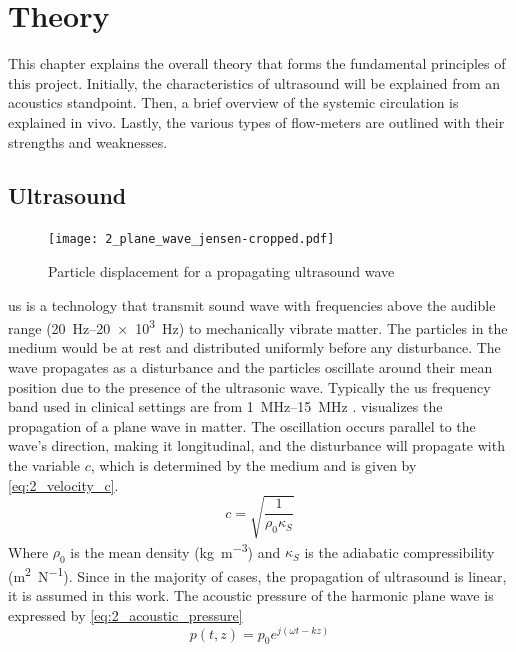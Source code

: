 \chapter{Theory} \label{sec:theory}
This chapter explains the overall theory that forms the fundamental principles of this project. Initially, the characteristics of ultrasound will be explained from an acoustics standpoint. Then, a brief overview of the systemic circulation is explained in vivo. Lastly, the various types of flow-meters are outlined with their strengths and weaknesses. 
\section{Ultrasound}
\begin{figure}[ht]
	\centering
	\texttt{[image: 2\_plane\_wave\_jensen-cropped.pdf]}
	\caption[Particle displacement for a propagating ultrasound wave]{Particle displacement for a propagating ultrasound wave \cite{JensenUltrasoundBook}}
	\label{fig:2_planewave_jensen}
\end{figure}
\gls{us} is a technology that transmit sound wave with frequencies above the audible range (\qtyrange[range-units = single]{20}{20e3}{\hertz}) to mechanically vibrate matter. The particles in the medium would be at rest and distributed uniformly before any disturbance. The wave propagates as a disturbance and the particles oscillate around their mean position due to the presence of the ultrasonic wave. Typically the \gls{us} frequency band used in clinical settings are from \qtyrange[range-units = single]{1}{15}{\mega\hertz} \cite{Szabo_UltrasoundBook_2}.  visualizes the propagation of a plane wave in matter. The oscillation occurs parallel to the wave's direction, making it longitudinal, and the disturbance will propagate with the variable $c$, which is determined by the medium and is given by \cref{eq:2_velocity_c}.
\begin{equation} \label{eq:2_velocity_c}
	c = \sqrt{\frac{1}{\rho_{0} \kappa_{S}}}
\end{equation}
Where $\rho_{0}$ is the mean density (\unit{\kilogram\per\meter\cubed}) and $\kappa_{S}$ is the \gls{adiabatic} compressibility (\unit{\meter\squared\per\newton}). Since in the majority of cases, the propagation of ultrasound is linear, it is assumed in this work. The acoustic pressure of the harmonic plane wave is expressed by \cref{eq:2_acoustic_pressure}
\begin{equation} \label{eq:2_acoustic_pressure}
	p(t,z)=p_{0} e^{j(\omega t - k z)}
\end{equation}
